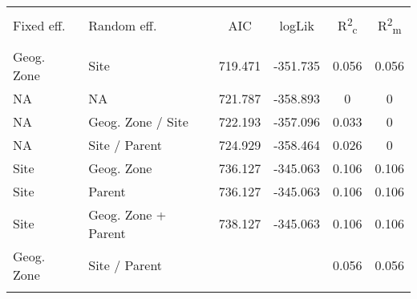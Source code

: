 
\begin{table}[!htbp] \centering 
  \caption{} 
  \label{lmer_comp} 
\begin{tabular}{@{\extracolsep{5pt}} llS[table-format=3.2]S[table-format=3.2]S[table-format=3.2]S[table-format=3.2]} 
\\[-1.8ex]\hline 
\hline \\[-1.8ex] 
{Fixed eff.} & {Random eff.} & {AIC} & {logLik} & {R\textsuperscript{2}\textsubscript{c}} & {R\textsuperscript{2}\textsubscript{m}} \\
\hline \\[-1.8ex] 
Geog. Zone & Site & 719.471 & -351.735 & 0.056 & 0.056 \\ 
NA & NA & 721.787 & -358.893 & 0 & 0 \\ 
NA & Geog. Zone / Site & 722.193 & -357.096 & 0.033 & 0 \\ 
NA & Site / Parent & 724.929 & -358.464 & 0.026 & 0 \\ 
Site & Geog. Zone & 736.127 & -345.063 & 0.106 & 0.106 \\ 
Site & Parent & 736.127 & -345.063 & 0.106 & 0.106 \\ 
Site & Geog. Zone + Parent & 738.127 & -345.063 & 0.106 & 0.106 \\ 
Geog. Zone & Site / Parent &  &  & 0.056 & 0.056 \\ 
\hline \\[-1.8ex] 
\end{tabular} 
\end{table} 
